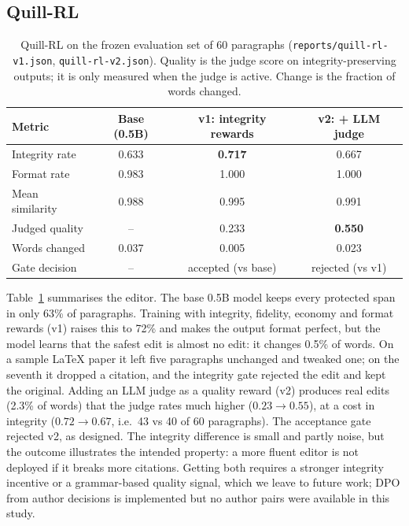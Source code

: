 \documentclass[11pt]{article}
\begin{document}
\subsection{Quill-RL}

\begin{table}[t]
\centering
\caption{Quill-RL on the frozen evaluation set of 60 paragraphs (\texttt{reports/quill-rl-v1.json}, \texttt{quill-rl-v2.json}). Quality is the judge score on integrity-preserving outputs; it is only measured when the judge is active. Change is the fraction of words changed.}
\label{tab:quill}
\small
\begin{tabular}{lccc}
\toprule
Metric & Base (0.5B) & v1: integrity rewards & v2: + LLM judge \\
\midrule
Integrity rate & 0.633 & \textbf{0.717} & 0.667 \\
Format rate & 0.983 & 1.000 & 1.000 \\
Mean similarity & 0.988 & 0.995 & 0.991 \\
Judged quality & -- & 0.233 & \textbf{0.550} \\
Words changed & 0.037 & 0.005 & 0.023 \\
\midrule
Gate decision & -- & accepted (vs base) & rejected (vs v1) \\
\bottomrule
\end{tabular}
\end{table}

Table~\ref{tab:quill} summarises the editor.
The base 0.5B model keeps every protected span in only 63\% of paragraphs.
Training with integrity, fidelity, economy and format rewards (v1) raises this to 72\% and makes the output format perfect, but the model learns that the safest edit is almost no edit: it changes 0.5\% of words.
On a sample LaTeX paper it left five paragraphs unchanged and tweaked one; on the seventh it dropped a citation, and the integrity gate rejected the edit and kept the original.
Adding an LLM judge as a quality reward (v2) produces real edits (2.3\% of words) that the judge rates much higher ($0.23 \rightarrow 0.55$), at a cost in integrity ($0.72 \rightarrow 0.67$, i.e.\ 43 vs 40 of 60 paragraphs).
The acceptance gate rejected v2, as designed.
The integrity difference is small and partly noise, but the outcome illustrates the intended property: a more fluent editor is not deployed if it breaks more citations.
Getting both requires a stronger integrity incentive or a grammar-based quality signal, which we leave to future work; DPO from author decisions is implemented but no author pairs were available in this study.
\end{document}
